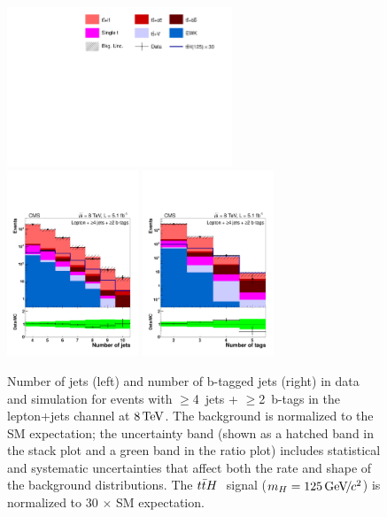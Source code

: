 \begin{figure}[hbtp!]
 \begin{center}
   \includegraphics[width=0.60\textwidth]{Figures/Analysis_1_Diagrams/samples_legend_wide.pdf} \\
   \includegraphics[width=0.35\textwidth]{Figures/Analysis_1_Diagrams/d2MCPlots_numJets_cut0_jge4_tge2_Combined_HtWgt.pdf}
   \includegraphics[width=0.35\textwidth]{Figures/Analysis_1_Diagrams/d2MCPlots_numTags_cut0_jge4_tge2_Combined_HtWgt.pdf}
   \caption{Number of jets (left) and number of b-tagged jets
   (right) in data and simulation for events with $\ge$4~jets +
   $\ge$2~b-tags in the lepton+jets channel at $8 \,\text{Te\hspace{-.08em}V}$. The
   background is normalized to the SM expectation; 
   the uncertainty band (shown as a hatched band in the
   stack plot and a green band in the ratio plot) includes statistical
   and systematic uncertainties that affect both the rate and shape of
   the background distributions.  The $t{\bar{t}}H~$ signal ($m_{H} =                                                                                                  
   125 {\,\text{Ge\hspace{-.08em}V\hspace{-0.16em}/\hspace{-0.08em}}c^\text{2}}$) is normalized to 30 $\times$ SM expectation.}
   \label{fig:njetsntags_LJ}
 \end{center}
\end{figure}

